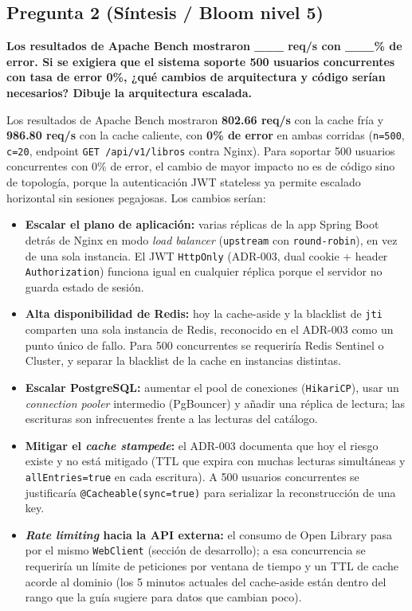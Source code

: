 \documentclass[12pt,a4paper]{article}
\begin{document}
\subsection*{Pregunta 2 (Síntesis / Bloom nivel 5)}

\textbf{Los resultados de Apache Bench mostraron \_\_\_ req/s con \_\_\_\% de error. Si se
exigiera que el sistema soporte 500 usuarios concurrentes con tasa de error 0\%, ¿qué
cambios de arquitectura y código serían necesarios? Dibuje la arquitectura escalada.}

Los resultados de Apache Bench mostraron \textbf{802.66 req/s} con la cache fría y
\textbf{986.80 req/s} con la cache caliente, con \textbf{0\% de error} en ambas corridas
(\texttt{n=500}, \texttt{c=20}, endpoint \texttt{GET /api/v1/libros} contra Nginx). Para
soportar 500 usuarios concurrentes con 0\% de error, el cambio de mayor impacto no es de
código sino de topología, porque la autenticación JWT stateless ya permite escalado
horizontal sin sesiones pegajosas. Los cambios serían:

\begin{itemize}[itemsep=2pt]
  \item \textbf{Escalar el plano de aplicación:} varias réplicas de la app Spring Boot
  detrás de Nginx en modo \textit{load balancer} (\texttt{upstream} con \texttt{round-robin}),
  en vez de una sola instancia. El JWT \texttt{HttpOnly} (ADR-003, dual cookie + header
  \texttt{Authorization}) funciona igual en cualquier réplica porque el servidor no guarda
  estado de sesión.
  \item \textbf{Alta disponibilidad de Redis:} hoy la cache-aside y la blacklist de
  \texttt{jti} comparten una sola instancia de Redis, reconocido en el ADR-003 como un
  punto único de fallo. Para 500 concurrentes se requeriría Redis Sentinel o Cluster, y
  separar la blacklist de la cache en instancias distintas.
  \item \textbf{Escalar PostgreSQL:} aumentar el pool de conexiones (\texttt{HikariCP}),
  usar un \textit{connection pooler} intermedio (PgBouncer) y añadir una réplica de
  lectura; las escrituras son infrecuentes frente a las lecturas del catálogo.
  \item \textbf{Mitigar el \textit{cache stampede}:} el ADR-003 documenta que hoy el riesgo
  existe y no está mitigado (TTL que expira con muchas lecturas simultáneas y
  \texttt{allEntries=true} en cada escritura). A 500 usuarios concurrentes se justificaría
  \texttt{@Cacheable(sync=true)} para serializar la reconstrucción de una key.
  \item \textbf{\textit{Rate limiting} hacia la API externa:} el consumo de Open Library
  pasa por el mismo \texttt{WebClient} (sección de desarrollo); a esa concurrencia se
  requeriría un límite de peticiones por ventana de tiempo y un TTL de cache acorde al
  dominio (los 5 minutos actuales del cache-aside están dentro del rango que la guía
  sugiere para datos que cambian poco).
\end{itemize}
\end{document}
